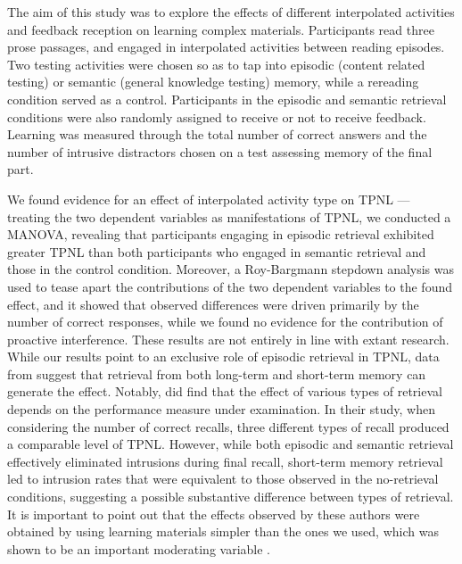 \documentclass[../main.tex]{subfiles}
\begin{document}
The aim of this study was to explore the effects of different interpolated 
activities and feedback reception on learning complex materials. Participants 
read three prose passages, and engaged in interpolated activities between 
reading episodes. Two testing activities were chosen so as to tap into episodic 
(content related testing) or semantic (general knowledge testing) memory, while 
a rereading condition served as a control. Participants in the episodic and 
semantic retrieval conditions were also randomly assigned to receive or not to 
receive feedback. Learning was measured through the total number of correct 
answers and the number of intrusive distractors chosen on a test assessing 
memory of the final part.

We found evidence for an effect of interpolated activity type on TPNL --- 
treating the two dependent variables as manifestations of TPNL, we conducted a 
MANOVA, revealing that participants engaging in episodic retrieval exhibited 
greater TPNL than both participants who engaged in semantic retrieval and those 
in the control condition. Moreover, a Roy-Bargmann stepdown analysis was used 
to tease apart the contributions of the two dependent variables to the found 
effect, and it showed that observed differences were driven primarily by the 
number of correct responses, while we found no evidence for the contribution of 
proactive interference. These results are not entirely in line with extant 
research. While our results point to an exclusive role of episodic retrieval
in TPNL, data from \cite{pastotterRetrievalLearningFacilitates2011} 
suggest that retrieval from both long-term and short-term memory
can generate the effect. Notably, 
\cite{pastotterRetrievalLearningFacilitates2011} did find that the effect of 
various types of retrieval depends on the performance measure under 
examination. In their study, when considering the number of correct recalls, 
three different types of recall produced a comparable level of TPNL. However, 
while both episodic and semantic retrieval effectively eliminated intrusions 
during final recall, short-term memory retrieval led to intrusion rates that 
were equivalent to those observed in the no-retrieval conditions, suggesting a 
possible substantive difference between types of retrieval. It is important to 
point out that the effects observed by these authors were obtained by using 
learning materials simpler than the ones we used, which was shown to be an 
important moderating variable \citep{chanRetrievalPotentiatesNew2018}.
\end{document}
